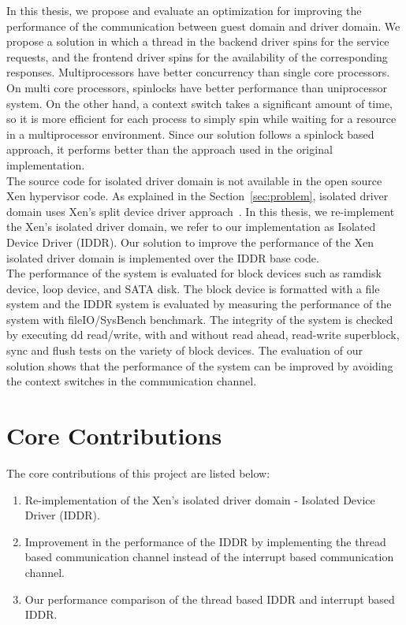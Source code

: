 In this thesis, we propose and evaluate an optimization for improving the performance of the communication between guest domain and driver domain. We propose a solution in which a thread in the backend driver spins for the service requests, and the frontend driver spins for the availability of the corresponding responses. Multiprocessors have better concurrency than single core processors. On multi core processors, spinlocks have better performance than uniprocessor system. On the other hand, a context switch takes a significant amount of time, so it is more efficient for each process to simply spin while waiting for a resource in a multiprocessor environment. Since our solution follows a spinlock based approach, it performs better than the approach used in the original implementation.
\\[3mm]
The source code for isolated driver domain is not available in the open source Xen hypervisor code. As explained in the Section~\ref{sec:problem}, isolated driver domain uses Xen's split device driver approach~\cite{Fraser04safehardware}. In this thesis, we re-implement the Xen's isolated driver domain, we refer to our implementation as Isolated Device Driver (IDDR). Our solution to improve the performance of the Xen isolated driver domain is implemented over the IDDR base code.
\\[3mm]
The performance of the system is evaluated for block devices such as ramdisk device, loop device, and SATA disk. The block device is formatted with a file system and the IDDR system is evaluated by measuring the performance of the system with fileIO/SysBench benchmark. The integrity of the system is checked by executing dd read/write, with and without read ahead, read-write superblock, sync and flush tests on the variety of block devices. The evaluation of our solution shows that the performance of the system can be improved by avoiding the context switches in the communication channel. 
\pagebreak
\section{Core Contributions}
The core contributions of this project are listed below: 
\begin{enumerate}
\item Re-implementation of the Xen's isolated driver domain - Isolated Device Driver (IDDR).
\item Improvement in the performance of the IDDR by implementing the thread based communication channel instead of the interrupt based communication channel. 
\item Our performance comparison of the thread based IDDR and interrupt based IDDR.
\end{enumerate}

